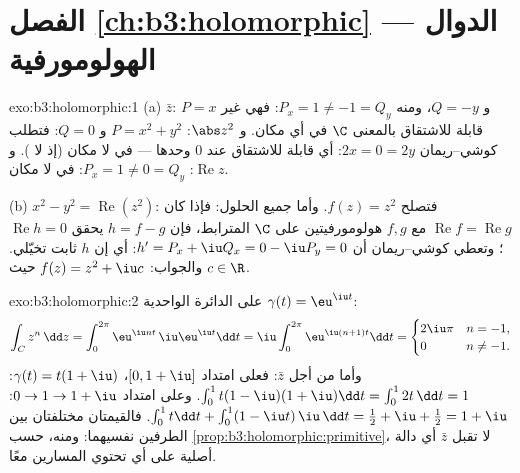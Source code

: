 \section*{الفصل \ref{ch:b3:holomorphic} --- الدوال
الهولومورفية}

\begin{solution}{exo:b3:holomorphic:1}
(a) $\bar z$: $P = x$ و $Q = -y$، ومنه $P_x = 1 \neq -1 = Q_y$: فهي غير قابلة
للاشتقاق بالمعنى $\C$ في أي مكان. و $\abs z^2$: $P = x^2 + y^2$
و $Q =
0$: فتطلب كوشي--ريمان $2x = 0 = 2y$: أي قابلة للاشتقاق عند
$0$ وحدها ---  في لا مكان (إذ لا ).
و $\operatorname{Re}z$: $P_x = 1 \neq 0 = Q_y$: في لا مكان.

(b) $x^2 - y^2 = \operatorname{Re}(z^2)$: فتصلح $f(z) = z^2$. وأما جميع الحلول: فإذا كان
$\operatorname{Re}f = \operatorname{Re}g$ مع $f, g$ هولومورفيتين على $\C$ المترابط، فإن $h = f -
g$ يحقق
$\operatorname{Re}h = 0$؛ وتعطي كوشي--ريمان أن $h' =
P_x + \iu Q_x = 0 - \iu P_y = 0$: أي إن $h$ ثابت تخيّلي.
والجواب: $f(z) = z^2 + \iu c$ حيث $c \in \R$.
\end{solution}

\begin{solution}{exo:b3:holomorphic:2}
على الدائرة الواحدية $\gamma(t) = \eu^{\iu t}$:
\[
\int_C z^n\,\dd z = \int_0^{2\pi}\eu^{\iu nt}\,\iu\eu^{\iu
t}\dd t = \iu\int_0^{2\pi}\eu^{\iu(n+1)t}\dd t
= \begin{cases} 2\iu\pi & n = -1,\\ 0 & n \neq -1.\end{cases}
\]
وأما من أجل $\bar z$: فعلى امتداد $[0, 1+\iu]$، $\gamma(t) = t(1 + \iu)$: $\int_0^1 t(1 - \iu)(1 + \iu)\dd t = \int_0^12t\,\dd t = 1$.
وعلى امتداد $0 \to 1 \to 1 + \iu$: $\int_0^1t\dd t +
\int_0^1(1 - \iu t)\,\iu\,\dd t = \frac12 + \iu + \frac12 = 1
+ \iu$. فالقيمتان مختلفتان بين الطرفين
نفسيهما: ومنه، حسب \cref{prop:b3:holomorphic:primitive}، لا تقبل $\bar z$ أي دالة أصلية
على أي  تحتوي المسارين معًا.
\end{solution}

